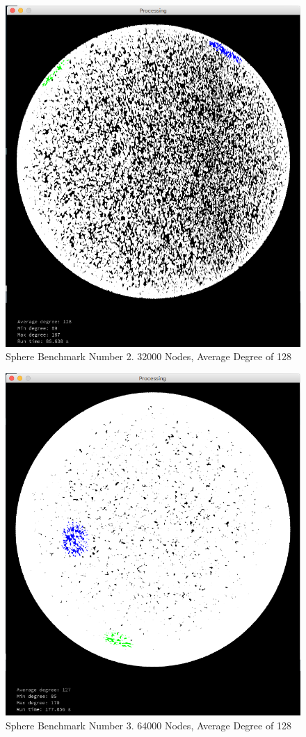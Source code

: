 \documentclass{article}
\begin{document}
\begin{figure}
    \centering
    \includegraphics[scale=0.45]{./images/sphere_1.png}
    \caption{Sphere Benchmark Number 2. 32000 Nodes, Average Degree of 128}
    \label{sphere1}
\end{figure}

\begin{figure}
    \centering
    \includegraphics[scale=0.45]{./images/sphere_2.png}
    \caption{Sphere Benchmark Number 3. 64000 Nodes, Average Degree of 128}
    \label{sphere2}
\end{figure}
\end{document}
